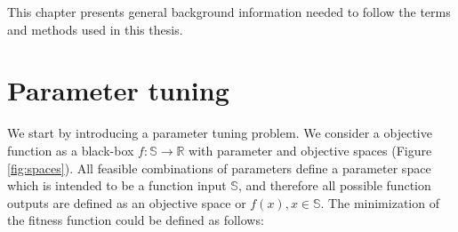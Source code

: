 
    This chapter presents general background information needed to follow the terms and methods used in this thesis. 

    \section{Parameter tuning}
        We start by introducing a parameter tuning problem. We consider a objective function as a black-box $f : \mathbb{S} \rightarrow \mathbb{R}$ with parameter and objective spaces (Figure \ref{fig:spaces}). All feasible combinations of parameters define a parameter space which is intended to be a function input $\mathbb{S}$, and therefore all possible function outputs are defined as an objective space or $f(x), x \in \mathbb{S}$. The minimization of the fitness function could be defined as follows:

